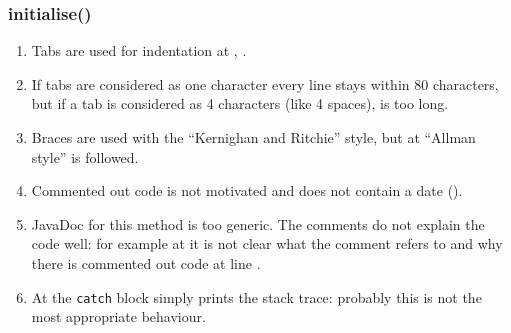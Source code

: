 \subsubsection{initialise()}
\begin{enumerate}
    \item {} Tabs are used for indentation at , .
    \item {} If tabs are considered as one character every line stays within 80 characters, but if a tab is considered as 4 characters (like 4 spaces),  is too long.
    \item {} Braces are used with the ``Kernighan and Ritchie'' style, but at  ``Allman style'' is followed.
    \item {} Commented out code is not motivated and does not contain a date ().
    \item {} JavaDoc for this method is too generic.
    The comments do not explain the code well: for example at  it is not clear what the comment refers to and why there is commented out code at line .
    \item {} At  the \texttt{catch} block simply prints the stack trace: probably this is not the most appropriate behaviour.
\end{enumerate}
